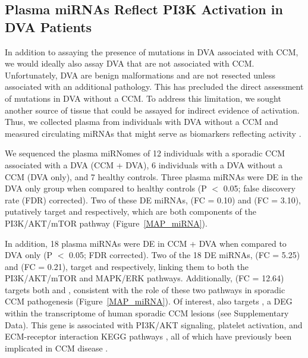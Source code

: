 \subsection{Plasma miRNAs Reflect PI3K Activation in DVA Patients}

In addition to assaying the presence of  mutations in DVA associated with CCM, we would ideally also assay DVA that are not associated with CCM. Unfortunately, DVA are benign malformations and are not resected unless associated with an additional pathology. This has precluded the direct assessment of  mutations in DVA without a CCM.   To address this limitation, we sought another source of tissue that could be assayed for indirect evidence of  activation.  Thus, we collected plasma from individuals with DVA without a CCM and measured circulating miRNAs that might serve as biomarkers reflecting  activity \citep{mori2019}.

We sequenced the plasma miRNomes of 12 individuals with a sporadic CCM associated with a DVA (CCM + DVA), 6 individuals with a DVA without a CCM (DVA only), and 7 healthy controls. Three plasma miRNAs were DE in the DVA only group when compared to healthy controls (P $<$ 0.05; false discovery rate (FDR) corrected). Two of these DE miRNAs,  (FC = 0.10) and  (FC = 3.10), putatively target  and  respectively, which are both components of the PI3K/AKT/mTOR pathway (Figure~\ref{MAP_miRNA}).

In addition, 18 plasma miRNAs were DE in CCM + DVA when compared to DVA only (P $<$ 0.05; FDR corrected). Two of the 18 DE miRNAs,  (FC = 5.25) and  (FC = 0.21), target  and  respectively, linking them to both the PI3K/AKT/mTOR and MAPK/ERK pathways. Additionally,  (FC = 12.64) targets both  and , consistent with the role of these two pathways in sporadic CCM pathogenesis (Figure~\ref{MAP_miRNA}). Of interest,  also targets , a DEG within the transcriptome of human sporadic CCM lesions (see Supplementary Data). This gene is associated with PI3K/AKT signaling, platelet activation, and ECM-receptor interaction KEGG pathways \citep{kanehisa2021, kanehisa2000}, all of which have previously been implicated in CCM disease \citep{faurobert2013, hong2021, ramirez2019, ren2021}.

